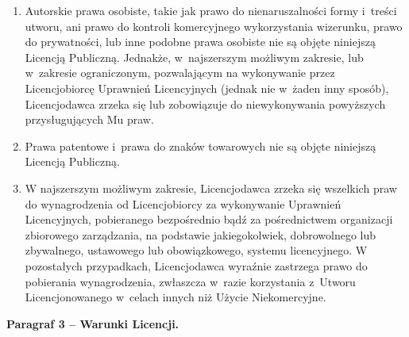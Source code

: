 \documentclass[oneside,polish,11pt,rmheadings]{mwbk}
\begin{document}
\begin{enumerate}
\begin{enumerate}
\item  Autorskie prawa osobiste, takie jak prawo do nienaruszalności formy i~treści utworu, ani prawo do kontroli komercyjnego wykorzystania wizerunku, prawo do prywatności, lub inne podobne prawa osobiste nie są objęte niniejszą Licencją Publiczną. Jednakże, w~najszerszym możliwym zakresie, lub w~zakresie ograniczonym, pozwalającym na wykonywanie przez Licencjobiorcę Uprawnień Licencyjnych (jednak nie w~żaden inny sposób), Licencjodawca zrzeka się lub zobowiązuje do niewykonywania powyższych przysługujących Mu praw.  
\item  Prawa patentowe i~prawa do znaków towarowych nie są objęte niniejszą Licencją Publiczną.  
\item  W najszerszym możliwym zakresie, Licencjodawca zrzeka się wszelkich praw do wynagrodzenia od Licencjobiorcy za wykonywanie Uprawnień Licencyjnych, pobieranego bezpośrednio bądź za pośrednictwem organizacji zbiorowego zarządzania, na podstawie jakiegokolwiek, dobrowolnego lub zbywalnego, ustawowego lub obowiązkowego, systemu licencyjnego. W pozostałych przypadkach, Licencjodawca wyraźnie zastrzega prawo do pobierania wynagrodzenia, zwłaszcza w~razie korzystania z~Utworu Licencjonowanego w~celach innych niż Użycie Niekomercyjne.  
\end{enumerate} 

\end{enumerate}

\textbf{Paragraf 3 – Warunki Licencji.} 
\end{document}
